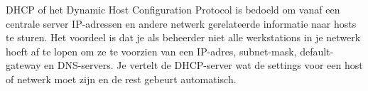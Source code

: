 DHCP of het Dynamic Host Configuration Protocol is bedoeld om vanaf een centrale server IP-adressen en andere netwerk gerelateerde informatie naar hosts te sturen. Het voordeel is dat je als beheerder niet alle werkstations in je netwerk hoeft af te lopen om ze te voorzien van een IP-adres, subnet-mask, default-gateway en DNS-servers. Je vertelt de DHCP-server wat de settings voor een host of netwerk moet zijn en de rest gebeurt automatisch.

